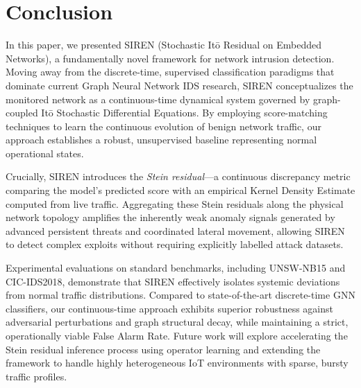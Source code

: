 \section{Conclusion}\label{sec:conclusion}

In this paper, we presented SIREN (Stochastic It\=o Residual on Embedded Networks), a fundamentally novel framework for network intrusion detection. Moving away from the discrete-time, supervised classification paradigms that dominate current Graph Neural Network IDS research, SIREN conceptualizes the monitored network as a continuous-time dynamical system governed by graph-coupled It\=o Stochastic Differential Equations. By employing score-matching techniques to learn the continuous evolution of benign network traffic, our approach establishes a robust, unsupervised baseline representing normal operational states.

Crucially, SIREN introduces the \textit{Stein residual}—a continuous discrepancy metric comparing the model's predicted score with an empirical Kernel Density Estimate computed from live traffic. Aggregating these Stein residuals along the physical network topology amplifies the inherently weak anomaly signals generated by advanced persistent threats and coordinated lateral movement, allowing SIREN to detect complex exploits without requiring explicitly labelled attack datasets. 

Experimental evaluations on standard benchmarks, including UNSW-NB15 and CIC-IDS2018, demonstrate that SIREN effectively isolates systemic deviations from normal traffic distributions. Compared to state-of-the-art discrete-time GNN classifiers, our continuous-time approach exhibits superior robustness against adversarial perturbations and graph structural decay, while maintaining a strict, operationally viable False Alarm Rate. Future work will explore accelerating the Stein residual inference process using operator learning and extending the framework to handle highly heterogeneous IoT environments with sparse, bursty traffic profiles.
